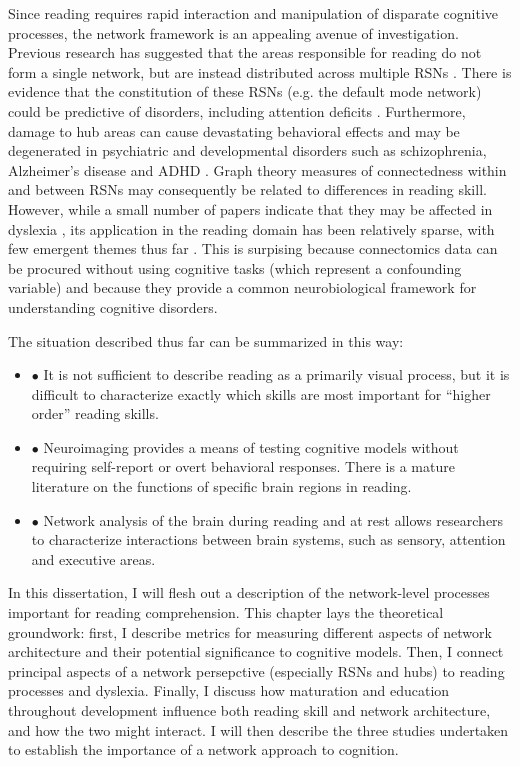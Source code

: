 Since reading requires rapid interaction and manipulation of disparate cognitive processes, the network framework is an appealing avenue of investigation. Previous research has suggested that the areas responsible for reading do not form a single network, but are instead distributed across multiple RSNs \citep{Vogel2013}. There is evidence that the constitution of these RSNs (e.g. the default mode network) could be predictive of disorders, including attention deficits \citep{Uddin2008}. Furthermore, damage to hub areas can cause devastating behavioral effects \citep{Warren2014} and may be degenerated in psychiatric and developmental disorders such as schizophrenia, Alzheimer's disease and ADHD \citep{Stam2014}. Graph theory measures of connectedness within and between RSNs may consequently be related to differences in reading skill. However, while a small number of papers indicate that they may be affected in dyslexia \citep{Qi2016, Finn2014}, its application in the reading domain has been relatively sparse, with few emergent themes thus far \citep{Cao2016}. This is surpising because connectomics data can be procured without using cognitive tasks (which represent a confounding variable) and because they provide a common neurobiological framework for understanding cognitive disorders.

The situation described thus far can be summarized in this way:

\begin{itemize}
    \item $\bullet$ It is not sufficient to describe reading as a primarily visual process, but it is difficult to characterize exactly which skills are most important for ``higher order'' reading skills.
    \item $\bullet$ Neuroimaging provides a means of testing cognitive models without requiring self-report or overt behavioral responses. There is a mature literature on the functions of specific brain regions in reading.
    \item $\bullet$ Network analysis of the brain during reading and at rest allows researchers to characterize interactions between brain systems, such as sensory, attention and executive areas.
\end{itemize}


In this dissertation, I will flesh out a description of the network-level processes important for reading comprehension. This chapter lays the theoretical groundwork: first, I describe metrics for measuring different aspects of network architecture and their potential significance to cognitive models. Then, I connect principal aspects of a network persepctive (especially RSNs and hubs) to reading processes and dyslexia. Finally, I discuss how maturation and education throughout development influence both reading skill and network architecture, and how the two might interact. I will then describe the three studies undertaken to establish the importance of a network approach to cognition.


